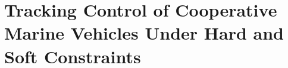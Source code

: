 \chapter{Tracking Control of Cooperative Marine Vehicles Under Hard and Soft Constraints}
\label{chap:handpos_tracking}

